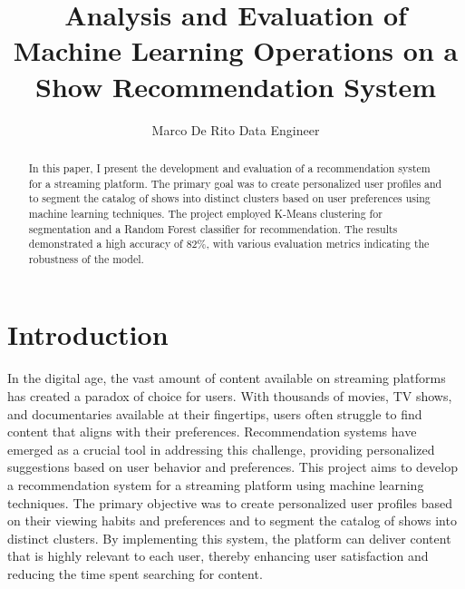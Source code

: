 \documentclass[sigconf]{acmart}
\begin{document}
	\title{Analysis and Evaluation of Machine Learning Operations on a Show Recommendation System}
	\author{Marco De Rito
		Data Engineer}
	\begin{abstract}
		In this paper, I present the development and evaluation of a recommendation system for a streaming platform. The primary goal was to create personalized user profiles and to segment the catalog of shows into distinct clusters based on user preferences using machine learning techniques. The project employed K-Means clustering for segmentation and a Random Forest classifier for recommendation. The results demonstrated a high accuracy of 82\%, with various evaluation metrics indicating the robustness of the model.
	\end{abstract}
	\maketitle
	\section{Introduction}
	In the digital age, the vast amount of content available on streaming platforms has created a paradox of choice for users. With thousands of movies, TV shows, and documentaries available at their fingertips, users often struggle to find content that aligns with their preferences. Recommendation systems have emerged as a crucial tool in addressing this challenge, providing personalized suggestions based on user behavior and preferences. This project aims to develop a recommendation system for a streaming platform using machine learning techniques. The primary objective was to create personalized user profiles based on their viewing habits and preferences and to segment the catalog of shows into distinct clusters. By implementing this system, the platform can deliver content that is highly relevant to each user, thereby enhancing user satisfaction and reducing the time spent searching for content.
\end{document}
